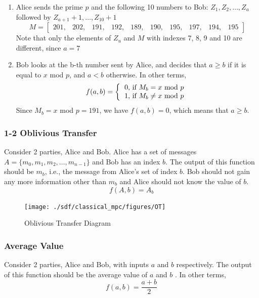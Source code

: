 \begin{refsection}
\begin{enumerate}
\item Alice sends the prime $p$ and the following 10 numbers to Bob: $Z_1,Z_2,\ldots,Z_a$
followed by $Z_{a+1}+1,\ldots,Z_{10}+1$
\[
M = \begin{bmatrix}
        201,&202,&191,&192,&189,&190,&195,&197,&194,&195
      \end{bmatrix}
\]
Note that only the elements of $Z_u$ and $M$ with indexes 7, 8, 9 and 10 are different, since $a = 7$

\item Bob looks at the b-th number sent by Alice, and decides that $a \geq b$ if it is equal to $x$ mod $p$,
and $a < b$ otherwise. In other terms,
\[
f(a,b) = \left \{
          \begin{tabular}{ccc}
          0, if $M_b = x$ mod $p$ \\
          1, if $M_b \ne x$ mod $p$
          \end{tabular}
        \right.
\]
Since $M_b = x$ mod $p = 191$, we have $f(a,b) = 0$, which means that $a \geq b$.
\end{enumerate}

\subsubsection{1-2 Oblivious Transfer}
Consider 2 parties, Alice and Bob. Alice has a set of messages $A=\{m_0,m_1,m_2,\ldots,m_{n-1}\}$
and Bob has an index $b$. The output of this function should be $m_b$, i.e., the message from Alice's set of index $b$. Bob should not gain any more information other than $m_b$ and Alice should not know the value of $b$.
\begin{equation}\label{eq:messageaccess}
f(A,b) = A_b
\end{equation}

\renewcommand{\figurename}{Figure}
\begin{figure}[H]
\centering
\texttt{[image: ./sdf/classical\_mpc/figures/OT]}
\caption{Oblivious Transfer Diagram}
\label{fig:otscheme}
\end{figure}





\subsubsection{Average Value}
Consider 2 parties, Alice and Bob, with inputs $a$ and $b$ respectively. The output of this function should be the average value of $a$ and $b$
. In other terms,
\begin{equation}\label{eq:tpc}
f(a,b) = \frac{a+b}{2}
\end{equation}


\end{refsection}
